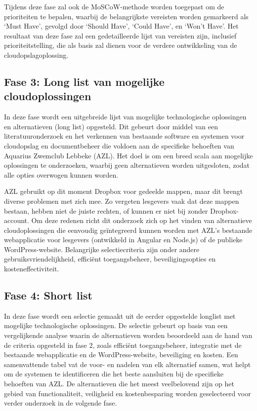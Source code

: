 Tijdens deze fase zal ook de MoSCoW-methode worden toegepast om de prioriteiten te bepalen, waarbij de belangrijkste vereisten worden gemarkeerd als ‘Must Have’, gevolgd door ‘Should Have’, ‘Could Have’, en ‘Won’t Have’. Het resultaat van deze fase zal een gedetailleerde lijst van vereisten zijn, inclusief prioriteitstelling, die als basis zal dienen voor de verdere ontwikkeling van de cloudopslagoplossing.

\subsection{Fase 3: Long list van mogelijke cloudoplossingen}
In deze fase wordt een uitgebreide lijst van mogelijke technologische oplossingen en alternatieven (long list) opgesteld. Dit gebeurt door middel van een literatuuronderzoek en het verkennen van bestaande software en systemen voor cloudopslag en documentbeheer die voldoen aan de specifieke behoeften van Aquarius Zwemclub Lebbeke (AZL). Het doel is om een breed scala aan mogelijke oplossingen te onderzoeken, waarbij geen alternatieven worden uitgesloten, zodat alle opties overwogen kunnen worden.

AZL gebruikt op dit moment Dropbox voor gedeelde mappen, maar dit brengt diverse problemen met zich mee. Zo vergeten lesgevers vaak dat deze mappen bestaan, hebben niet de juiste rechten, of kunnen er niet bij zonder Dropbox-account. Om deze redenen richt dit onderzoek zich op het vinden van alternatieve cloudoplossingen die eenvoudig geïntegreerd kunnen worden met AZL’s bestaande webapplicatie voor lesgevers (ontwikkeld in Angular en Node.js) of de publieke WordPress-website. Belangrijke selectiecriteria zijn onder andere gebruiksvriendelijkheid, efficiënt toegangsbeheer, beveiligingsopties en kosteneffectiviteit.
\subsection{Fase 4: Short list}
In deze fase wordt een selectie gemaakt uit de eerder opgestelde longlist met mogelijke technologische oplossingen. De selectie gebeurt op basis van een vergelijkende analyse waarin de alternatieven worden beoordeeld aan de hand van de criteria opgesteld in fase 2, zoals efficiënt toegangsbeheer, integratie met de bestaande webapplicatie en de WordPress-website, beveiliging en kosten. Een samenvattende tabel vat de voor- en nadelen van elk alternatief samen, wat helpt om de systemen te identificeren die het beste aansluiten bij de specifieke behoeften van AZL. De alternatieven die het meest veelbelovend zijn op het gebied van functionaliteit, veiligheid en kostenbesparing worden geselecteerd voor verder onderzoek in de volgende fase.
